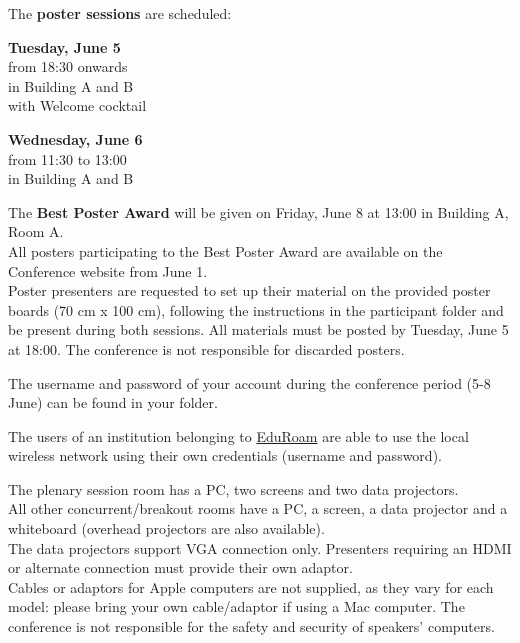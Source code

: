 
\noindent The \textbf{poster sessions} are scheduled:
\begin{center}
  \textbf{Tuesday, June 5} \\
  from 18:30 onwards \\
  in Building A and B\\
  with Welcome cocktail

  \bigskip
   
  \textbf{Wednesday, June 6} \\
  from 11:30 to 13:00 \\
  in Building A and B
\end{center}

\noindent The \textbf{Best Poster Award} will be given on Friday, June 8 at 13:00 in Building A, Room A.\\

\noindent All posters participating to the Best Poster Award are available on the Conference website from June 1.\\
Poster presenters are requested to set up
their material on the provided poster boards (70 cm x 100 cm), following the instructions in the participant folder and be present during both sessions.  
All materials must be posted by Tuesday, June 5 at 18:00.
The conference is not responsible for discarded posters.


The username and password of your account during the conference period (5-8 June) can be found in your folder.

The users of an institution belonging to \href{https://www.eduroam.org/}{EduRoam} are able to use the local wireless network using their own credentials (username and password).

The plenary session room has a PC, two screens and two data projectors.\\ 
All other concurrent/breakout rooms have a PC, a screen, a data projector and a whiteboard (overhead projectors are also available).\\
The data projectors support VGA connection only. Presenters requiring an HDMI or alternate connection must provide their own adaptor.\\
Cables or adaptors for Apple computers are not supplied, as they vary for each model: please bring your own cable/adaptor if using a Mac computer. 
The conference is not responsible for the safety and security of speakers' computers.

